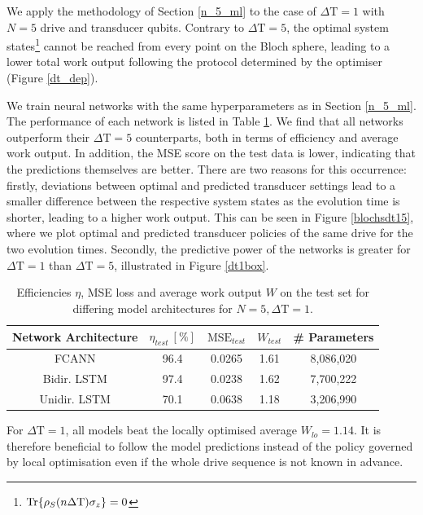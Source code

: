 We apply the methodology of Section \ref{n_5_ml} to the case of $\Delta \mathrm{T} = 1$ with $N=5$ drive and transducer qubits.
Contrary to $\Delta \mathrm{T} = 5$, the optimal system states\footnote{$\Tr{\rho_S(n \Delta \mathrm{T}) \sigma_z} = 0$} cannot be reached from every point on the Bloch sphere, leading to a lower total work output following the protocol determined by the optimiser (Figure \ref{dt_dep}).

We train neural networks with the same hyperparameters as in Section \ref{n_5_ml}.
The performance of each network is listed in Table \ref{effdt1}.
We find that all networks outperform their $\Delta \mathrm{T} = 5$ counterparts, both in terms of efficiency and average work output.
In addition, the MSE score on the test data is lower, indicating that the predictions themselves are better.
There are two reasons for this occurrence: firstly, deviations between optimal and predicted transducer settings lead to a smaller difference between the respective system states as the evolution time is shorter, leading to a higher work output.
This can be seen in Figure \ref{blochsdt15}, where we plot optimal and predicted transducer policies of the same drive for the two evolution times.
Secondly, the predictive power of the networks is greater for $\Delta \mathrm{T} = 1$ than $\Delta \mathrm{T} = 5$, illustrated in Figure \ref{dt1box}.

\begin{table}[h]
	\centering
	\begin{tabular}{ c | c | c | c | c }
		Network Architecture & $\eta_{test} \ [\%]$ & $\mathrm{MSE}_{test}$  & $W_{test}$ & \# Parameters \\
		\hline
		FCANN        & 96.4 & 0.0265 & 1.61 & 8,086,020 \\
		Bidir. LSTM  & 97.4 & 0.0238 & 1.62 & 7,700,222 \\
		Unidir. LSTM & 70.1 & 0.0638 & 1.18 & 3,206,990 \\
	\end{tabular}
	\caption{Efficiencies $\eta$, MSE loss and average work output $W$ on the test set for differing model architectures for $N=5, \Delta \mathrm{T} = 1$.}
	\label{effdt1}
\end{table}

For $\Delta \mathrm{T} = 1$, all models beat the locally optimised average $W_{lo} = 1.14$.
It is therefore beneficial to follow the model predictions instead of the policy governed by local optimisation even if the whole drive sequence is not known in advance.

